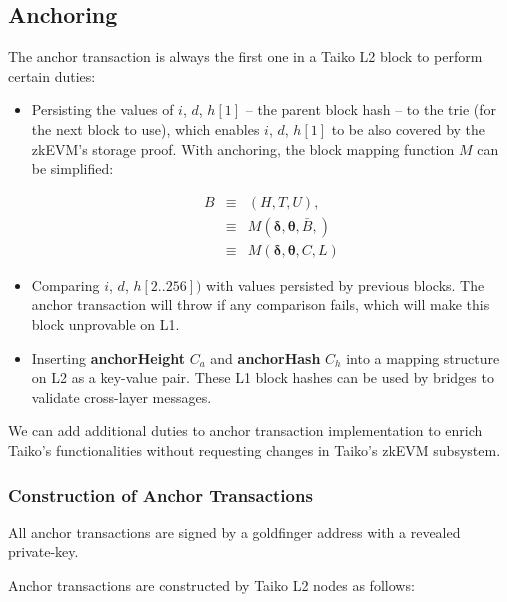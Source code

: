 \documentclass[9pt,oneside]{amsart}
\begin{document}
\begin{multicols}{2}
\subsection{Anchoring} \label{sec:anchoring}

The anchor transaction is always the first one in a Taiko L2 block to perform certain duties:

\begin{itemize}
\item Persisting the values of $i$, $d$, $h[1]$ -- the parent block hash -- to the trie (for the next block to use), which enables $i$, $d$, $h[1]$ to be also covered by the zkEVM's storage proof.   With anchoring, the block mapping function $M$  can be simplified:

\begin{eqnarray}
B & \equiv & (H, T, U), \\
\nonumber & \equiv &  M(\boldsymbol{\delta}, \boldsymbol{\theta}, \bar{B}, )  \\
\nonumber & \equiv & M(\boldsymbol{\delta},  \boldsymbol{\theta}, C, L)
\end{eqnarray}

\item Comparing $i$, $d$, $h[2..256])$ with values persisted by previous blocks. The anchor transaction will throw if any comparison fails, which will make this block unprovable on L1.
\item Inserting \textbf{anchorHeight} $C_a$ and \textbf{anchorHash} $C_h$ into a mapping structure on L2 as a key-value pair. These L1 block hashes can be used by bridges to validate cross-layer messages.
\end{itemize}

We can add additional duties to anchor transaction implementation to enrich Taiko's functionalities without requesting changes in Taiko's zkEVM subsystem.

\subsubsection{Construction of Anchor Transactions} All anchor transactions are signed by a goldfinger address with a revealed private-key. 

Anchor transactions are constructed by Taiko L2 nodes as follows:


\end{multicols}
\end{document}
